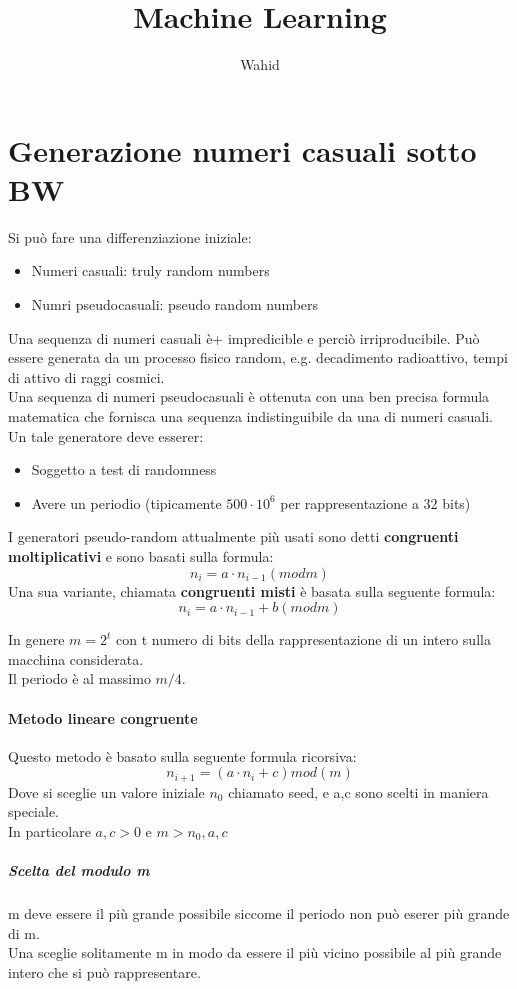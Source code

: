 \documentclass[10pt,a4paper]{book}
\author{Wahid}
\title{Machine Learning}
\begin{document}
	
\chapter{Generazione numeri casuali sotto BW}
Si può fare una differenziazione iniziale:
\begin{itemize}
	\item Numeri casuali: truly random numbers
	\item Numri pseudocasuali: pseudo random numbers
\end{itemize}
Una sequenza di numeri casuali è+ impredicible e perciò irriproducibile. Può essere generata da un processo fisico random, e.g. decadimento radioattivo, tempi di attivo di raggi cosmici.\\
Una sequenza di numeri pseudocasuali è ottenuta con una ben precisa formula matematica che fornisca una sequenza indistinguibile da una di numeri casuali.\\
Un tale generatore deve esserer:
\begin{itemize}
	\item Soggetto a test di randomness
	\item Avere un periodio (tipicamente $500 \cdot 10^6$ per rappresentazione a 32 bits)
\end{itemize}
I generatori pseudo-random attualmente più usati sono detti \textbf{congruenti moltiplicativi} e sono basati sulla formula:
$$n_i = a \cdot n_{i-1} (mod m)$$
Una sua variante, chiamata \textbf{congruenti misti} è basata sulla seguente formula:
$$n_i = a \cdot n_{i-1} + b (mod m)$$

In genere $m = 2^t$ con t numero di bits della rappresentazione di un intero sulla macchina considerata. \\
Il periodo è al massimo $m/4$.\\

\subsubsection{Metodo lineare congruente}
Questo metodo è basato sulla seguente formula ricorsiva:
$$n_{i+1} = (a\cdot n_i + c)mod(m)$$
Dove si sceglie un valore iniziale $n_0$ chiamato seed, e a,c sono scelti in maniera speciale. \\
In particolare $a,c > 0$ e $m > n_0,a,c$\\
\paragraph{Scelta del modulo m}
m deve essere il più grande possibile siccome il periodo non può eserer più grande di m.\\
Una sceglie solitamente m in modo da essere il più vicino possibile al più grande intero che si può rappresentare.\\
\end{document}
